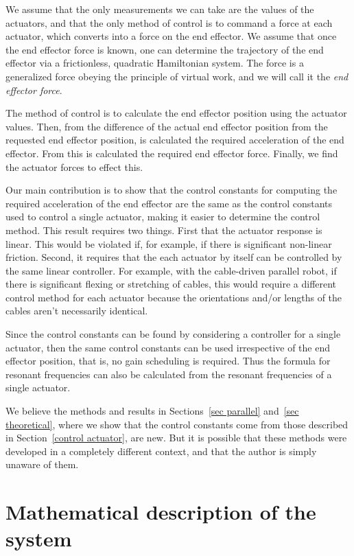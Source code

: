 \documentclass[oneside,twocolumn,reqno]{amsart}
\begin{document}
We assume that the only measurements we can take are the values of the actuators, and that the only method of control is to command a force at each actuator, which converts into a force on the end effector.  We assume that once the end effector force is known, one can determine the trajectory of the end effector via a frictionless, quadratic Hamiltonian system.  The force is a generalized force obeying the principle of virtual work, and we will call it the \emph{end effector force}.

The method of control is to calculate the end effector position using the actuator values.  Then, from the difference of the actual end effector position from the requested end effector position, is calculated the required acceleration of the end effector.  From this is calculated the required end effector force.  Finally, we find the actuator forces to effect this.

Our main contribution is to show that the control constants for computing the required acceleration of the end effector are the same as the control constants used to control a single actuator, making it easier to determine the control method.  This result requires two things.  First that the actuator response is linear.  This would be violated if, for example, if there is significant non-linear friction.  Second, it requires that the each actuator by itself can be controlled by the same linear controller.  For example, with the cable-driven parallel robot, if there is significant flexing or stretching of cables, this would require a different control method for each actuator because the orientations and/or lengths of the cables aren't necessarily identical.

Since the control constants can be found by considering a controller for a single actuator, then the same control constants can be used irrespective of the end effector position, that is, no gain scheduling is required.  Thus the formula for resonant frequencies can also be calculated from the resonant frequencies of a single actuator.  

We believe the methods and results in Sections~\ref{sec parallel} and~\ref{sec theoretical}, where we show that the control constants come from those described in Section~\ref{control actuator}, are new.  But it is possible that these methods were developed in a completely different context, and that the author is simply unaware of them.

\section{Mathematical description of the system}
\end{document}
